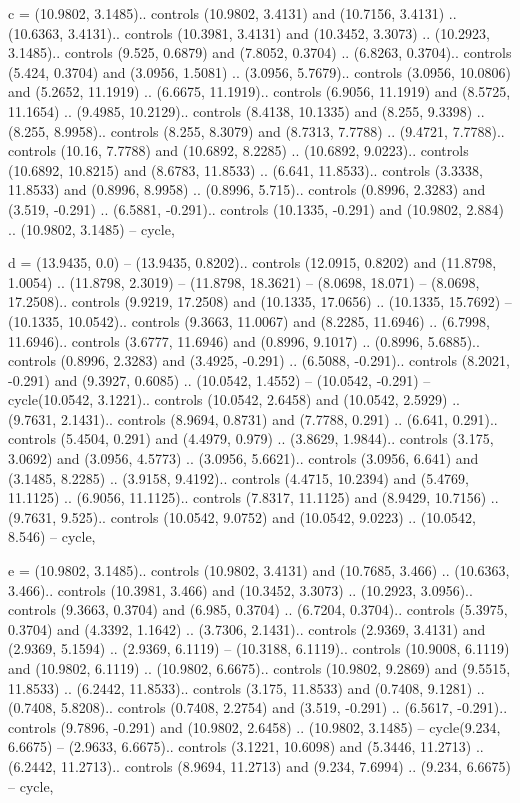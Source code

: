 c = {(10.9802, 3.1485).. controls (10.9802, 3.4131) and (10.7156, 3.4131) .. (10.6363, 3.4131).. controls (10.3981, 3.4131) and (10.3452, 3.3073) .. (10.2923, 3.1485).. controls (9.525, 0.6879) and (7.8052, 0.3704) .. (6.8263, 0.3704).. controls (5.424, 0.3704) and (3.0956, 1.5081) .. (3.0956, 5.7679).. controls (3.0956, 10.0806) and (5.2652, 11.1919) .. (6.6675, 11.1919).. controls (6.9056, 11.1919) and (8.5725, 11.1654) .. (9.4985, 10.2129).. controls (8.4138, 10.1335) and (8.255, 9.3398) .. (8.255, 8.9958).. controls (8.255, 8.3079) and (8.7313, 7.7788) .. (9.4721, 7.7788).. controls (10.16, 7.7788) and (10.6892, 8.2285) .. (10.6892, 9.0223).. controls (10.6892, 10.8215) and (8.6783, 11.8533) .. (6.641, 11.8533).. controls (3.3338, 11.8533) and (0.8996, 8.9958) .. (0.8996, 5.715).. controls (0.8996, 2.3283) and (3.519, -0.291) .. (6.5881, -0.291).. controls (10.1335, -0.291) and (10.9802, 2.884) .. (10.9802, 3.1485) -- cycle},

d = {(13.9435, 0.0) -- (13.9435, 0.8202).. controls (12.0915, 0.8202) and (11.8798, 1.0054) .. (11.8798, 2.3019) -- (11.8798, 18.3621) -- (8.0698, 18.071) -- (8.0698, 17.2508).. controls (9.9219, 17.2508) and (10.1335, 17.0656) .. (10.1335, 15.7692) -- (10.1335, 10.0542).. controls (9.3663, 11.0067) and (8.2285, 11.6946) .. (6.7998, 11.6946).. controls (3.6777, 11.6946) and (0.8996, 9.1017) .. (0.8996, 5.6885).. controls (0.8996, 2.3283) and (3.4925, -0.291) .. (6.5088, -0.291).. controls (8.2021, -0.291) and (9.3927, 0.6085) .. (10.0542, 1.4552) -- (10.0542, -0.291) -- cycle(10.0542, 3.1221).. controls (10.0542, 2.6458) and (10.0542, 2.5929) .. (9.7631, 2.1431).. controls (8.9694, 0.8731) and (7.7788, 0.291) .. (6.641, 0.291).. controls (5.4504, 0.291) and (4.4979, 0.979) .. (3.8629, 1.9844).. controls (3.175, 3.0692) and (3.0956, 4.5773) .. (3.0956, 5.6621).. controls (3.0956, 6.641) and (3.1485, 8.2285) .. (3.9158, 9.4192).. controls (4.4715, 10.2394) and (5.4769, 11.1125) .. (6.9056, 11.1125).. controls (7.8317, 11.1125) and (8.9429, 10.7156) .. (9.7631, 9.525).. controls (10.0542, 9.0752) and (10.0542, 9.0223) .. (10.0542, 8.546) -- cycle},

e = {(10.9802, 3.1485).. controls (10.9802, 3.4131) and (10.7685, 3.466) .. (10.6363, 3.466).. controls (10.3981, 3.466) and (10.3452, 3.3073) .. (10.2923, 3.0956).. controls (9.3663, 0.3704) and (6.985, 0.3704) .. (6.7204, 0.3704).. controls (5.3975, 0.3704) and (4.3392, 1.1642) .. (3.7306, 2.1431).. controls (2.9369, 3.4131) and (2.9369, 5.1594) .. (2.9369, 6.1119) -- (10.3188, 6.1119).. controls (10.9008, 6.1119) and (10.9802, 6.1119) .. (10.9802, 6.6675).. controls (10.9802, 9.2869) and (9.5515, 11.8533) .. (6.2442, 11.8533).. controls (3.175, 11.8533) and (0.7408, 9.1281) .. (0.7408, 5.8208).. controls (0.7408, 2.2754) and (3.519, -0.291) .. (6.5617, -0.291).. controls (9.7896, -0.291) and (10.9802, 2.6458) .. (10.9802, 3.1485) -- cycle(9.234, 6.6675) -- (2.9633, 6.6675).. controls (3.1221, 10.6098) and (5.3446, 11.2713) .. (6.2442, 11.2713).. controls (8.9694, 11.2713) and (9.234, 7.6994) .. (9.234, 6.6675) -- cycle},

